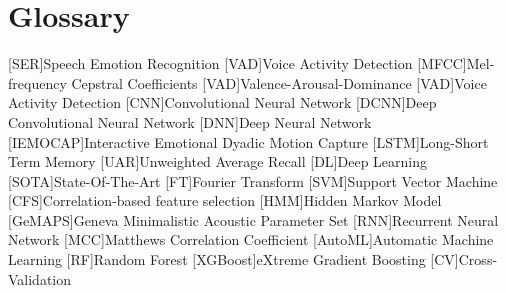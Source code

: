 \chapter{Glossary}

\footnotesize
\SingleSpacing

\begin{multicols}{2}
\begin{acronym}[AAAAAA]
    [SER]{Speech Emotion Recognition}
    [VAD]{Voice Activity Detection}
    [MFCC]{Mel-frequency Cepstral Coefficients}
    [VAD]{Valence-Arousal-Dominance}
    [VAD]{Voice Activity Detection}
    [CNN]{Convolutional Neural Network}
    [DCNN]{Deep Convolutional Neural Network}
    [DNN]{Deep Neural Network}
    [IEMOCAP]{Interactive Emotional Dyadic Motion Capture}
    [LSTM]{Long-Short Term Memory}
    [UAR]{Unweighted Average Recall}
    [DL]{Deep Learning}
    [SOTA]{State-Of-The-Art}
    [FT]{Fourier Transform}
    [SVM]{Support Vector Machine}
    [CFS]{Correlation-based feature selection}
    [HMM]{Hidden Markov Model}
    [GeMAPS]{Geneva Minimalistic Acoustic Parameter Set}
    [RNN]{Recurrent Neural Network}
    [MCC]{Matthews Correlation Coefficient}
    [AutoML]{Automatic Machine Learning}
    [RF]{Random Forest}
    [XGBoost]{eXtreme Gradient Boosting}
    [CV]{Cross-Validation}
\end{acronym}
\end{multicols}

